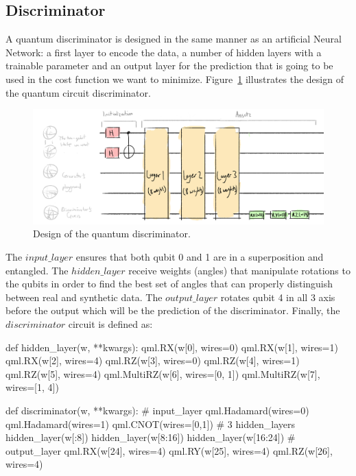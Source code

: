 \subsection{Discriminator}
\label{sec:disc}

A quantum discriminator is designed in the same manner as an artificial Neural
Network: a first layer to encode the data, a number of hidden layers with a 
trainable parameter and an output layer for the prediction that is going to be 
used in the cost function we want to minimize. Figure~\ref{fig:disc} illustrates
the design of the quantum circuit discriminator.

\begin{figure}[!htbp]
\centering
    \includegraphics[width=1\textwidth]{figures/discriminator.pdf}
\caption{Design of the quantum discriminator.}
\label{fig:disc}
\end{figure}

The $input\_layer$ ensures that both qubit 0 and 1 are in a superposition and 
entangled. The $hidden\_layer$ receive weights (angles) that manipulate
rotations to the qubits in order to find the best set of angles that can properly
distinguish between real and synthetic data. The $output\_layer$ rotates qubit 4
in all 3 axis before the output which will be the prediction of the discriminator.
Finally, the $discriminator$ circuit is defined as:
\begin{python}
def hidden_layer(w, **kwargs):
    qml.RX(w[0], wires=0)
    qml.RX(w[1], wires=1)
    qml.RX(w[2], wires=4)
    qml.RZ(w[3], wires=0)
    qml.RZ(w[4], wires=1)
    qml.RZ(w[5], wires=4)
    qml.MultiRZ(w[6], wires=[0, 1])
    qml.MultiRZ(w[7], wires=[1, 4])

def discriminator(w, **kwargs):
    # input_layer
    qml.Hadamard(wires=0)
    qml.Hadamard(wires=1)
    qml.CNOT(wires=[0,1])
    # 3 hidden_layers
    hidden_layer(w[:8])
    hidden_layer(w[8:16]) 
    hidden_layer(w[16:24])
    # output_layer
    qml.RX(w[24], wires=4)
    qml.RY(w[25], wires=4)
    qml.RZ(w[26], wires=4)
\end{python}

